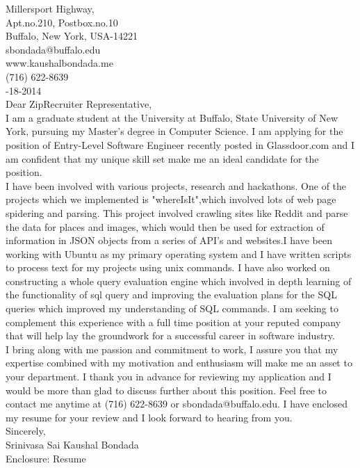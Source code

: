 \documentclass[10pt,letterpaper,oneside]{article}
\begin{document}
 Millersport Highway,\\
Apt.no.210, Postbox.no.10\\
Buffalo, New York, USA-14221\\
sbondada@buffalo.edu\\
www.kaushalbondada.me\\
(716) 622-8639\\

-18-2014\\
 
\noindent Dear ZipRecruiter Representative,\\
 
I am a graduate student at the University at Buffalo, State University of New York, pursuing my Master's degree in Computer Science. I am applying
for the position of Entry-Level Software Engineer recently posted in Glassdoor.com and I am confident that my unique skill set
make me an ideal candidate for the position.\\

I have been involved with various projects, research and hackathons. One of the projects which we implemented is "whereIsIt",which involved
lots of web page spidering and parsing. This project involved crawling sites like Reddit and parse the data for places and images, which would then be used for
extraction of information in JSON objects from a series of API's and websites.I have been working with Ubuntu as my primary operating system 
and I have written scripts to process text for my projects using unix commands. I have also worked on constructing a whole query evaluation
engine which involved in depth learning of the functionality of sql query and improving the evaluation plans for the SQL queries which improved
my understanding of SQL commands. I am seeking to complement this experience with a full time position at your reputed company that will help lay the groundwork for a successful career in software industry.\\

I bring along with me passion and commitment to work, I assure you that my expertise combined with my motivation
and enthusiasm will make me an asset to your department. I thank you in advance for reviewing my application and I would be more than glad to
discuss further about this position. Feel free to contact me anytime at (716) 622-8639 or sbondada@buffalo.edu. I have enclosed my resume for your review and I look forward to hearing from you.\\
 
\noindent Sincerely,\\
Srinivasa Sai Kaushal Bondada\\
Enclosure: Resume\\
\end{document}
